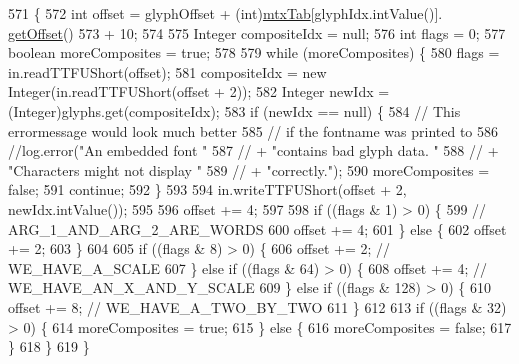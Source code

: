 \begin{DoxyCode}
571                                                                      \{
572         \textcolor{keywordtype}{int} offset = glyphOffset + (int)\mbox{\hyperlink{classorg_1_1newdawn_1_1slick_1_1tools_1_1hiero_1_1truetype_1_1_t_t_f_file_ad78a13682e242fc4a0b5d34a8e5807fa}{mtxTab}}[glyphIdx.intValue()].
      \mbox{\hyperlink{classorg_1_1newdawn_1_1slick_1_1tools_1_1hiero_1_1truetype_1_1_t_t_f_mtx_entry_af6ea5be112bd06d92519fd86878e000d}{getOffset}}()
573                      + 10;
574 
575         Integer compositeIdx = null;
576         \textcolor{keywordtype}{int} flags = 0;
577         \textcolor{keywordtype}{boolean} moreComposites = \textcolor{keyword}{true};
578 
579         \textcolor{keywordflow}{while} (moreComposites) \{
580             flags = in.readTTFUShort(offset);
581             compositeIdx = \textcolor{keyword}{new} Integer(in.readTTFUShort(offset + 2));
582             Integer newIdx = (Integer)glyphs.get(compositeIdx);
583             \textcolor{keywordflow}{if} (newIdx == null) \{
584                 \textcolor{comment}{// This errormessage would look much better}
585                 \textcolor{comment}{// if the fontname was printed to}
586                 \textcolor{comment}{//log.error("An embedded font "}
587                 \textcolor{comment}{//                     + "contains bad glyph data. "}
588                 \textcolor{comment}{//                     + "Characters might not display "}
589                 \textcolor{comment}{//                     + "correctly.");}
590                 moreComposites = \textcolor{keyword}{false};
591                 \textcolor{keywordflow}{continue};
592             \}
593 
594             in.writeTTFUShort(offset + 2, newIdx.intValue());
595 
596             offset += 4;
597 
598             \textcolor{keywordflow}{if} ((flags & 1) > 0) \{
599                 \textcolor{comment}{// ARG\_1\_AND\_ARG\_2\_ARE\_WORDS}
600                 offset += 4;
601             \} \textcolor{keywordflow}{else} \{
602                 offset += 2;
603             \}
604 
605             \textcolor{keywordflow}{if} ((flags & 8) > 0) \{
606                 offset += 2;    \textcolor{comment}{// WE\_HAVE\_A\_SCALE}
607             \} \textcolor{keywordflow}{else} \textcolor{keywordflow}{if} ((flags & 64) > 0) \{
608                 offset += 4;    \textcolor{comment}{// WE\_HAVE\_AN\_X\_AND\_Y\_SCALE}
609             \} \textcolor{keywordflow}{else} \textcolor{keywordflow}{if} ((flags & 128) > 0) \{
610                 offset += 8;    \textcolor{comment}{// WE\_HAVE\_A\_TWO\_BY\_TWO}
611             \}
612 
613             \textcolor{keywordflow}{if} ((flags & 32) > 0) \{
614                 moreComposites = \textcolor{keyword}{true};
615             \} \textcolor{keywordflow}{else} \{
616                 moreComposites = \textcolor{keyword}{false};
617             \}
618         \}
619     \}
\end{DoxyCode}
